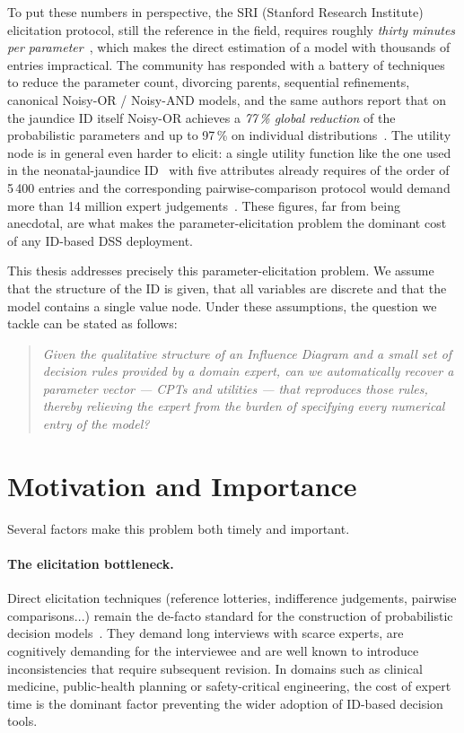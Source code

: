 To put these numbers in perspective, the SRI (Stanford Research Institute) elicitation
protocol, still the reference in the field, requires roughly \emph{thirty minutes per parameter}~\cite{bielza2010modeling},
which makes the direct estimation of a model with thousands of
entries impractical. The community has responded with a battery of
techniques to reduce the parameter count, divorcing parents,
sequential refinements, canonical Noisy-OR / Noisy-AND
models, and the same authors report that on the jaundice ID itself
Noisy-OR achieves a \emph{77\,\% global reduction} of the
probabilistic parameters and up to 97\,\% on individual
distributions~\cite{bielza2010modeling}. The utility node is in
general even harder to elicit: a single utility function like the one used in the neonatal-jaundice ID~\cite{gomez2007jaundice} with five
attributes already requires of the order of 5\,400 entries and the
corresponding pairwise-comparison protocol would demand more than
14 million expert judgements~\cite{bielza2010modeling}. These
figures, far from being anecdotal, are what makes the
parameter-elicitation problem the dominant cost of any ID-based
DSS deployment.

This thesis addresses precisely this parameter-elicitation problem.
We assume that the structure of the ID is given, that all variables
are discrete and that the model contains a single value node. Under
these assumptions, the question we tackle can be stated as follows:

\begin{quote}\itshape
Given the qualitative structure of an Influence Diagram and a small
set of decision rules provided by a domain expert, can we
automatically recover a parameter vector — CPTs and utilities — that
reproduces those rules, thereby relieving the expert from the burden
of specifying every numerical entry of the model?
\end{quote}

\section{Motivation and Importance}

Several factors make this problem both timely and important.

\paragraph*{The elicitation bottleneck.} Direct elicitation techniques (reference lotteries, indifference judgements, pairwise comparisons...)
remain the de-facto standard for the construction of probabilistic
decision models~\cite{bielza2010modeling}. They demand long interviews with scarce experts, are cognitively demanding for the interviewee and are well known to introduce inconsistencies that require subsequent revision. In domains such as clinical medicine,
public-health planning or safety-critical engineering, the cost of expert time is the dominant factor preventing the wider adoption of
ID-based decision tools.

